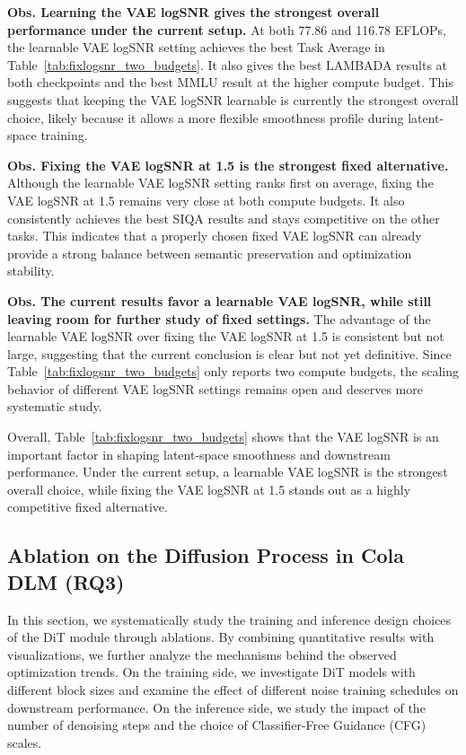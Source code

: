 \textbf{Obs.  Learning the VAE logSNR gives the strongest overall performance under the current setup.}
At both 77.86 and 116.78 EFLOPs, the learnable VAE logSNR setting achieves the best Task Average in Table~\ref{tab:fixlogsnr_two_budgets}. It also gives the best LAMBADA results at both checkpoints and the best MMLU result at the higher compute budget. This suggests that keeping the VAE logSNR learnable is currently the strongest overall choice, likely because it allows a more flexible smoothness profile during latent-space training.

\textbf{Obs.  Fixing the VAE logSNR at 1.5 is the strongest fixed alternative.}
Although the learnable VAE logSNR setting ranks first on average, fixing the VAE logSNR at 1.5 remains very close at both compute budgets. It also consistently achieves the best SIQA results and stays competitive on the other tasks. This indicates that a properly chosen fixed VAE logSNR can already provide a strong balance between semantic preservation and optimization stability.

\textbf{Obs.  The current results favor a learnable VAE logSNR, while still leaving room for further study of fixed settings.}
The advantage of the learnable VAE logSNR over fixing the VAE logSNR at 1.5 is consistent but not large, suggesting that the current conclusion is clear but not yet definitive. Since Table~\ref{tab:fixlogsnr_two_budgets} only reports two compute budgets, the scaling behavior of different VAE logSNR settings remains open and deserves more systematic study.

Overall, Table~\ref{tab:fixlogsnr_two_budgets} shows that the VAE logSNR is an important factor in shaping latent-space smoothness and downstream performance. Under the current setup, a learnable VAE logSNR is the strongest overall choice, while fixing the VAE logSNR at 1.5 stands out as a highly competitive fixed alternative.

\subsection{Ablation on the Diffusion Process in Cola DLM (RQ3)}
\label{exp:rq3}
In this section, we systematically study the training and inference design choices of the DiT module through ablations. By combining quantitative results with visualizations, we further analyze the mechanisms behind the observed optimization trends. On the training side, we investigate DiT models with different block sizes and examine the effect of different noise training schedules on downstream performance. On the inference side, we study the impact of the number of denoising steps and the choice of Classifier-Free Guidance (CFG) scales.

